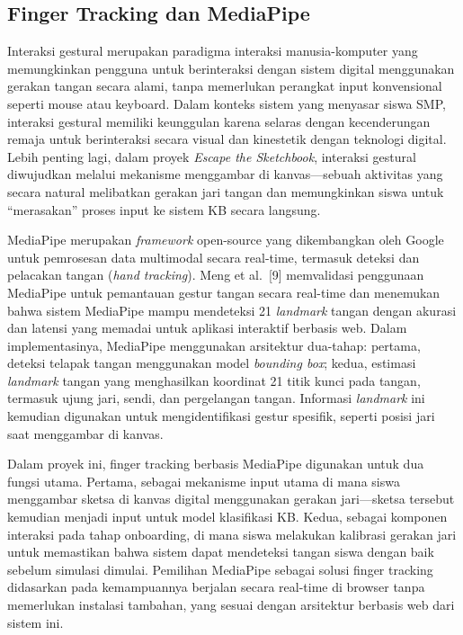 \documentclass[10pt,twoside,openright]{report}
\begin{document}
\subsection{Finger Tracking dan MediaPipe}
\label{subsec:finger-tracking}

Interaksi gestural merupakan paradigma interaksi manusia-komputer yang memungkinkan pengguna untuk berinteraksi dengan sistem digital menggunakan gerakan tangan secara alami, tanpa memerlukan perangkat input konvensional seperti mouse atau keyboard. Dalam konteks sistem yang menyasar siswa SMP, interaksi gestural memiliki keunggulan karena selaras dengan kecenderungan remaja untuk berinteraksi secara visual dan kinestetik dengan teknologi digital. Lebih penting lagi, dalam proyek \textit{Escape the Sketchbook}, interaksi gestural diwujudkan melalui mekanisme menggambar di kanvas---sebuah aktivitas yang secara natural melibatkan gerakan jari tangan dan memungkinkan siswa untuk ``merasakan'' proses input ke sistem KB secara langsung.

MediaPipe merupakan \textit{framework} open-source yang dikembangkan oleh Google untuk pemrosesan data multimodal secara real-time, termasuk deteksi dan pelacakan tangan (\textit{hand tracking}). Meng et al.\ [9] memvalidasi penggunaan MediaPipe untuk pemantauan gestur tangan secara real-time dan menemukan bahwa sistem MediaPipe mampu mendeteksi 21 \textit{landmark} tangan dengan akurasi dan latensi yang memadai untuk aplikasi interaktif berbasis web. Dalam implementasinya, MediaPipe menggunakan arsitektur dua-tahap: pertama, deteksi telapak tangan menggunakan model \textit{bounding box}; kedua, estimasi \textit{landmark} tangan yang menghasilkan koordinat 21 titik kunci pada tangan, termasuk ujung jari, sendi, dan pergelangan tangan. Informasi \textit{landmark} ini kemudian digunakan untuk mengidentifikasi gestur spesifik, seperti posisi jari saat menggambar di kanvas.

Dalam proyek ini, finger tracking berbasis MediaPipe digunakan untuk dua fungsi utama. Pertama, sebagai mekanisme input utama di mana siswa menggambar sketsa di kanvas digital menggunakan gerakan jari---sketsa tersebut kemudian menjadi input untuk model klasifikasi KB. Kedua, sebagai komponen interaksi pada tahap onboarding, di mana siswa melakukan kalibrasi gerakan jari untuk memastikan bahwa sistem dapat mendeteksi tangan siswa dengan baik sebelum simulasi dimulai. Pemilihan MediaPipe sebagai solusi finger tracking didasarkan pada kemampuannya berjalan secara real-time di browser tanpa memerlukan instalasi tambahan, yang sesuai dengan arsitektur berbasis web dari sistem ini.
\end{document}
